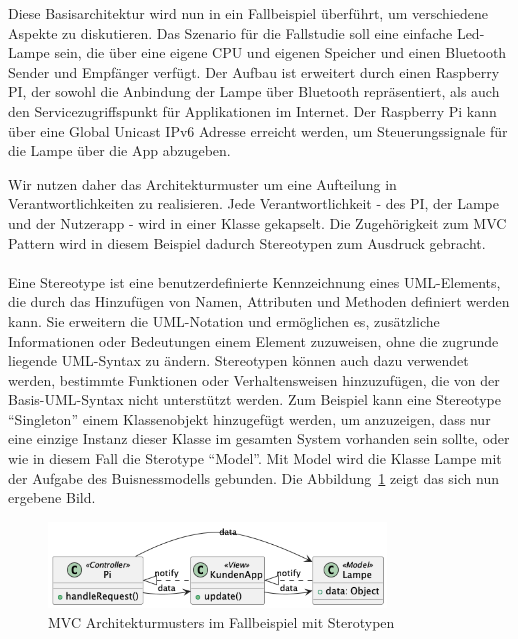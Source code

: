 Diese Basisarchitektur wird nun in ein Fallbeispiel überführt, um verschiedene Aspekte zu diskutieren. Das Szenario für die Fallstudie soll eine einfache Led-Lampe sein, die über eine eigene CPU und eigenen Speicher und einen Bluetooth Sender und Empfänger verfügt. Der Aufbau ist erweitert durch einen Raspberry PI, der sowohl die Anbindung der Lampe über Bluetooth repräsentiert, als auch den Servicezugriffspunkt für Applikationen im Internet. Der Raspberry Pi kann über eine Global Unicast IPv6 Adresse erreicht werden, um Steuerungssignale für die Lampe über die App abzugeben. 

Wir nutzen daher das Architekturmuster um eine Aufteilung in Verantwortlichkeiten zu realisieren. Jede Verantwortlichkeit - des PI, der Lampe und der Nutzerapp - wird in einer Klasse gekapselt. Die Zugehörigkeit zum MVC Pattern wird in diesem Beispiel dadurch Stereotypen zum Ausdruck gebracht.
\\\\
Eine Stereotype ist eine benutzerdefinierte Kennzeichnung eines UML-Elements, die durch das Hinzufügen von Namen, Attributen und Methoden definiert werden kann. Sie erweitern die UML-Notation und ermöglichen es, zusätzliche Informationen oder Bedeutungen einem Element zuzuweisen, ohne die zugrunde liegende UML-Syntax zu ändern. Stereotypen können auch dazu verwendet werden, bestimmte Funktionen oder Verhaltensweisen hinzuzufügen, die von der Basis-UML-Syntax nicht unterstützt werden. Zum Beispiel kann eine Stereotype \enquote{Singleton} einem Klassenobjekt hinzugefügt werden, um anzuzeigen, dass nur eine einzige Instanz dieser Klasse im gesamten System vorhanden sein sollte, oder wie in diesem Fall die Sterotype  \enquote{Model}. Mit Model wird die Klasse Lampe mit der Aufgabe des Buisnessmodells gebunden. 
Die Abbildung~\ref{fig:stereo-mvc} zeigt das sich nun ergebene Bild. 
\begin{figure}[ht]
  \centering
  \includegraphics[width=0.8\textwidth]{fig/uml/sterotypen-mvc.png}
  \caption{MVC Architekturmusters im Fallbeispiel mit Sterotypen}
  \label{fig:stereo-mvc}
\end{figure}

